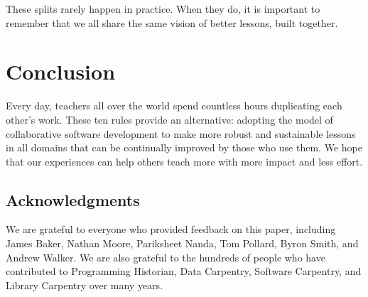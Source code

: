\documentclass[10pt,letterpaper]{article}
\begin{document}
These splits rarely happen in practice.
When they do,
it is important to remember that we all share the same vision of better lessons, built together.

\section*{Conclusion}

Every day,
teachers all over the world spend countless hours duplicating each other's work.
These ten rules provide an alternative:
adopting the model of collaborative software development
to make more robust and sustainable lessons in all domains
that can be continually improved by those who use them.
We hope that our experiences can help others teach more
with more impact and less effort.

\subsection*{Acknowledgments}

We are grateful to everyone who provided feedback on this paper,
including
James Baker,
Nathan Moore,
Pariksheet Nanda,
Tom Pollard,
Byron Smith,
and Andrew Walker.
We are also grateful to the hundreds of people who have contributed to
Programming Historian, Data Carpentry, Software Carpentry, and Library Carpentry
over many years.

\nolinenumbers

%
%

\newpage
\end{document}
